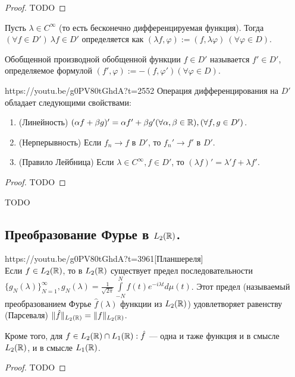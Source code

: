 \begin{proof}
	TODO
\end{proof}

\begin{Def}
	Пусть $\lambda\in C^\infty$ (то есть бесконечно дифференцируемая функция). Тогда $(\forall f\in D')\ \lambda f\in D'$ определяется как $(\lambda f,\varphi):=(f,\lambda\varphi)\ (\forall\varphi\in D)$.
\end{Def}

\begin{Def}
	Обобщенной производной обобщенной функции $f\in D'$ называется $f'\in D'$, определяемое формулой $(f',\varphi):=-(f,\varphi') (\forall\varphi\in D)$.
\end{Def}

\begin{linkthm}{https://youtu.be/g0PV80tGhdA?t=2552}
	Операция дифференцирования на $D'$ обладает следующими свойствами:
	\begin{enumerate}
		\item (Линейность) $(\alpha f+\beta g)'=\alpha f'+\beta g'(\forall\alpha,\beta\in\mathbb{R}),(\forall f,g\in D')$.
		\item (Нерперывность) Если $f_n\to f$ в $D'$, то $f_n'\to f'$ в $D'$.
		\item (Правило Лейбница) Если $\lambda\in C^\infty,f\in D'$, то $(\lambda f)'=\lambda' f+\lambda f'$.
	\end{enumerate}
\end{linkthm}

\begin{proof}
	TODO
\end{proof}

\begin{example}
TODO
\end{example}

\subsection{Преобразование Фурье в $L_2(\mathbb{R})$.}
\begin{linkthm}{https://youtu.be/g0PV80tGhdA?t=3961}[Планшереля]\ \\
	Если $f\in L_2(\mathbb{R})$, то в $L_2(\mathbb{R})$ существует предел последовательности $\{g_N(\lambda)\}_{N=1}^\infty, g_N(\lambda)=\frac{1}{\sqrt{2\pi}}\int\limits_{-N}^N f(t)e^{-i\lambda t}d\mu(t)$. Этот предел (называемый преобразованием Фурье $\hat{f}(\lambda)$ функции из $L_2(\mathbb{R})$) удовлетворяет равенству (Парсеваля) $\|\hat{f}\|_{L_2(\mathbb{R})}=\|f\|_{L_2(\mathbb{R})}$.
	
	Кроме того, для $f\in L_2(\mathbb{R})\cap L_1(\mathbb{R}): \hat{f}$ --- одна и таже функция и в смысле $L_2(\mathbb{R})$, и в смысле $L_1(\mathbb{R})$.
\end{linkthm}

\begin{proof}
TODO
\end{proof}













